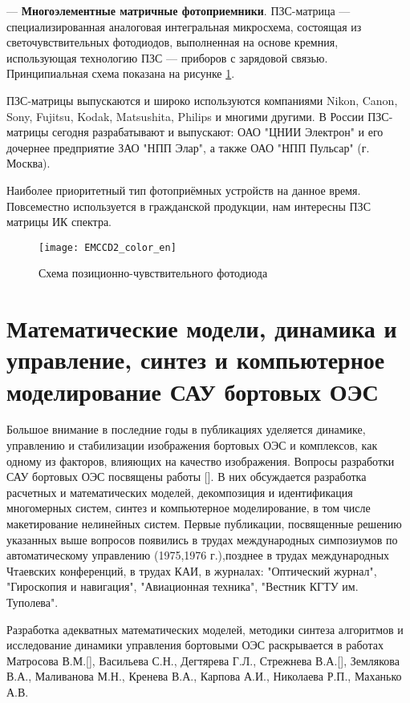 --- \textbf{Многоэлементные матричные фотоприемники}. ПЗС-матрица — специализированная аналоговая интегральная микросхема, состоящая из светочувствительных фотодиодов, выполненная на основе кремния, использующая технологию ПЗС — приборов с зарядовой связью. Принципиальная схема показана на рисунке \ref{fig:EMCCD2_color_en}\cite[]{CCD2}.
	
ПЗС-матрицы выпускаются и широко используются компаниями Nikon, Canon, Sony, Fujitsu, Kodak, Matsushita, Philips и многими другими. В России ПЗС-матрицы сегодня разрабатывают и выпускают: ОАО "ЦНИИ Электрон" и его дочернее предприятие ЗАО "НПП Элар", а также ОАО "НПП Пульсар" (г. Москва)\cite[]{CCD}.
	
Наиболее приоритетный тип фотоприёмных устройств на данное время. Повсеместно используется в гражданской продукции, нам интересны ПЗС матрицы ИК спектра.
	
	\begin{figure}[ht]
		\centering
		\texttt{[image: EMCCD2\_color\_en]} 
		\caption{Схема позиционно-чувствительного фотодиода}
		\label{fig:EMCCD2_color_en}
	\end{figure}
	

\section{Математические модели, динамика и управление, синтез и компьютерное моделирование САУ бортовых ОЭС} \label{sec:ch1/modeling}

Большое внимание в последние годы в публикациях уделяется динамике, управлению и стабилизации изображения бортовых ОЭС и комплексов, как одному из факторов, влияющих на качество изображения. Вопросы разработки САУ бортовых ОЭС посвящены работы []. В них обсуждается разработка расчетных и математических моделей, декомпозиция и идентификация многомерных систем, синтез и компьютерное моделирование, в том числе макетирование нелинейных систем. Первые публикации, посвященные решению указанных выше вопросов появились в трудах международных симпозиумов по автоматическому управлению (1975,1976 г.),позднее в трудах международных Чтаевских конференций, в трудах КАИ, в журналах: "Оптический журнал", "Гироскопия и навигация", "Авиационная техника", "Вестник КГТУ им. Туполева".

Разработка адекватных математических моделей, методики синтеза алгоритмов и исследование динамики управления бортовыми ОЭС раскрывается в работах Матросова В.М.[], Васильева С.Н., Дегтярева Г.Л., Стрежнева В.А.[], Землякова В.А., Маливанова М.Н., Кренева В.А., Карпова А.И., Николаева Р.П., Маханько А.В.

